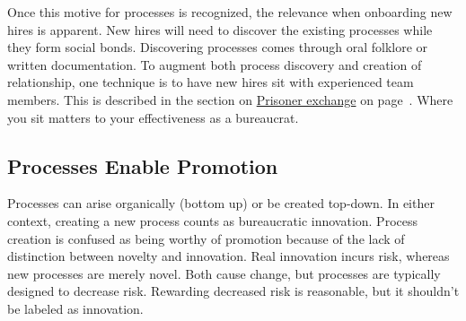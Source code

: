 Once this motive for processes is recognized, the relevance when onboarding new hires is apparent. New hires will need to discover the existing processes while they form social bonds. Discovering processes comes through oral folklore or written documentation. To augment both process discovery and creation of relationship, one technique is to have new hires sit with experienced team members.
This is described in the section on  
\hyperref[sec:prisoner-exchange]{Prisoner exchange} on 
page~\pageref{sec:prisoner-exchange}.
Where you sit matters to your effectiveness as a bureaucrat.

\subsection*{Processes Enable Promotion}

Processes can arise organically (bottom up) or be created top-down. In either context, creating a new process counts as bureaucratic innovation. Process creation is confused as being worthy of promotion because of the lack of distinction between novelty and innovation. Real innovation incurs risk, whereas new processes are merely novel. Both cause change, but processes are typically designed to decrease risk. Rewarding decreased risk is reasonable, but it shouldn't be labeled as innovation.

